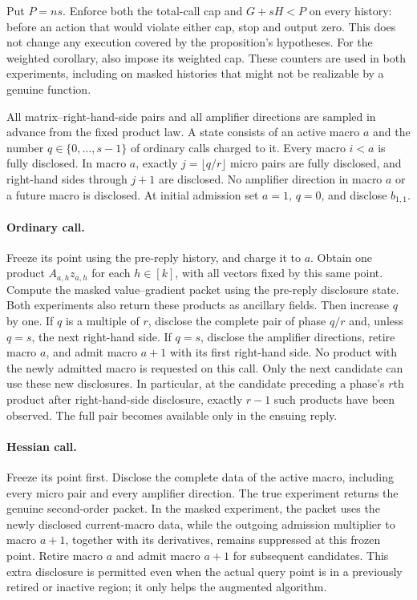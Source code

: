 \documentclass[11pt]{article}
\theoremstyle{definition}
\theoremstyle{remark}
\begin{document}
Put $P=ns$. Enforce both the total-call cap and $G+sH<P$ on every history: before an action that would violate either cap, stop and output zero. This does not change any execution covered by the proposition's hypotheses. For the weighted corollary, also impose its weighted cap. These counters are used in both experiments, including on masked histories that might not be realizable by a genuine function.

All matrix--right-hand-side pairs and all amplifier directions are sampled in advance from the fixed product law. A state consists of an active macro $a$ and the number $q\in\{0,\ldots,s-1\}$ of ordinary calls charged to it. Every macro $i<a$ is fully disclosed. In macro $a$, exactly $j=\lfloor q/r\rfloor$ micro pairs are fully disclosed, and right-hand sides through $j+1$ are disclosed. No amplifier direction in macro $a$ or a future macro is disclosed. At initial admission set $a=1$, $q=0$, and disclose $b_{1,1}$.

\paragraph{Ordinary call.}
Freeze its point using the pre-reply history, and charge it to $a$. Obtain one product $A_{a,h}z_{a,h}$ for each $h\in[k]$, with all vectors fixed by this same point. Compute the masked value--gradient packet using the pre-reply disclosure state. Both experiments also return these products as ancillary fields. Then increase $q$ by one. If $q$ is a multiple of $r$, disclose the complete pair of phase $q/r$ and, unless $q=s$, the next right-hand side. If $q=s$, disclose the amplifier directions, retire macro $a$, and admit macro $a+1$ with its first right-hand side. No product with the newly admitted macro is requested on this call. Only the next candidate can use these new disclosures.
In particular, at the candidate preceding a phase's $r$th product
after right-hand-side disclosure, exactly $r-1$ such products have
been observed. The full pair becomes available only in the ensuing reply.

\paragraph{Hessian call.}
Freeze its point first. Disclose the complete data of the active macro, including every micro pair and every amplifier direction. The true experiment returns the genuine second-order packet.
In the masked experiment, the packet uses the newly disclosed
current-macro data, while the outgoing admission multiplier to macro
$a+1$, together with its derivatives, remains suppressed at this
frozen point. Retire macro $a$ and admit macro $a+1$ for subsequent candidates. This extra disclosure is permitted even when the actual query point is in a previously retired or inactive region; it only helps the augmented algorithm.
\end{document}
